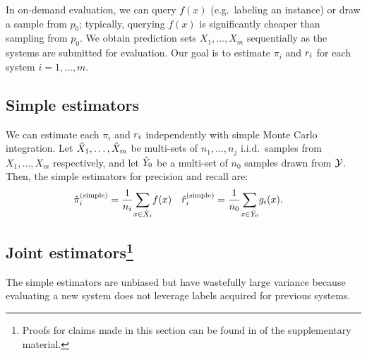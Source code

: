 In on-demand evaluation, we can query $f(x)$ (e.g.\, labeling an instance) or draw a sample from $p_0$;
typically, querying $f(x)$ is significantly cheaper than sampling from $p_0$.
We obtain prediction sets $X_1, \ldots, X_m$ sequentially as the systems are submitted for evaluation.
Our goal is to estimate $\pi_i$ and $r_i$ for each system $i = 1, \dots, m$.

\subsection{Simple estimators}
We can estimate each $\pi_i$ and $r_i$ independently with simple Monte Carlo integration. %
Let ${\hat{X}}_1, \ldots, {\hat{X}}_m$ be multi-sets of $n_1, \ldots, n_j$ i.i.d.~samples from $X_1, \ldots, X_m$ respectively, and let ${\hat{Y}}_0$ be a multi-set of $n_0$ samples drawn from $\mathcal{Y}$.
Then, the simple estimators for precision and recall are:
\begin{align*}
  {\hat{\pi}}_i^{\text{(simple)}} &= \frac1{n_i}\! \sum_{x \in {\hat{X}}_i}\! f(x) & {\hat{r}}_i^{\text{(simple)}} &= \frac1{n_0}\! \sum_{x \in {\hat{Y}}_0}\! g_i(x).
\end{align*}

\subsection{Joint estimators\footnote{Proofs for claims made in this section can be found in  of the supplementary material.}}
\label{sec:joint}
The simple estimators are unbiased but have wastefully large variance
because evaluating a new system does not leverage labels acquired for previous
systems.  %

